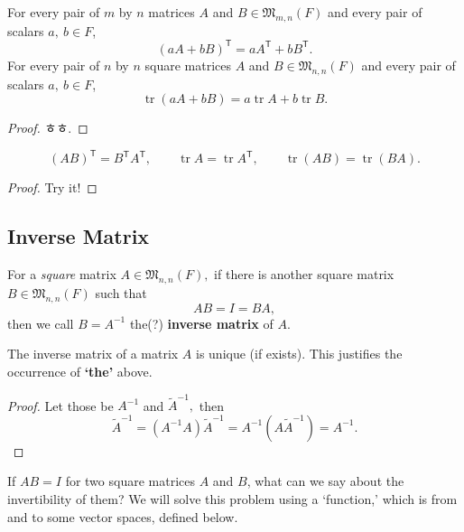 \begin{prop}
For every pair of $m$ by $n$ matrices $A$ and $B \in \mathfrak M_{m,n}(F)$ and every pair of scalars $a,~b \in F$, $$(aA + bB)^{\mathsf T} = a A^{\mathsf T} + bB^{\mathsf T}.$$ For every pair of $n$ by $n$ square matrices $A$ and $B \in \mathfrak M_{n,n}(F)$ and every pair of scalars $a,~b \in F$, $$\operatorname{tr}(aA + bB) = a \operatorname{tr}A + b \operatorname{tr}B.$$
\end{prop}
\begin{proof}
ㅎㅎ.
\end{proof}

\begin{prop}
$$(AB)^\mathsf T = B^\mathsf T A^\mathsf T, \qquad \operatorname{tr}A = \operatorname{tr} A^\mathsf T, \qquad \operatorname{tr}(AB) = \operatorname{tr}(BA).$$
\end{prop}
\begin{proof}
Try it!
\end{proof}


\subsection{Inverse Matrix}
\begin{defn}
For a \textit{square} matrix $A\in\mathfrak M_{n,n}(F),$ if there is another square matrix $B\in\mathfrak M_{n,n}(F)$ such that $$AB = I = BA,$$ then we call $B=A^{-1}$ the(?) \textbf{inverse matrix} of $A$.
\end{defn}

\begin{prop} The inverse matrix of a matrix $A$ is unique (if exists). This justifies the occurrence of \textbf{`the'} above.
\end{prop}
\begin{proof}
Let those be $A^{-1}$ and ${\tilde A }^{-1},$ then $${\tilde A }^{-1} = (A^{-1}A) {\tilde A }^{-1} = A^{-1}(A {\tilde A }^{-1}) = A^{-1}.$$
\end{proof}

\begin{quest} If $AB = I$ for two square matrices $A$ and $B$, what can we say about the invertibility of them? We will solve this problem using a `function,' which is from and to some vector spaces, defined below.
\end{quest}

\newpage

